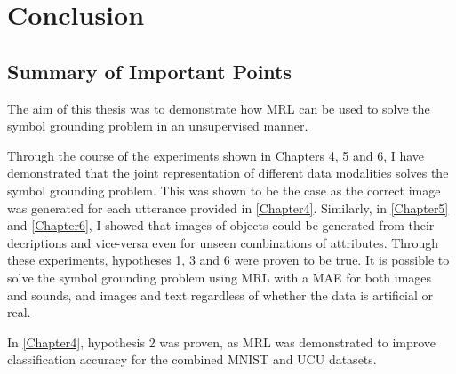 
\chapter{Conclusion} %

\label{Chapter7} %



\section{Summary of Important Points}
The aim of this thesis was to demonstrate how \ac{MRL} can be used to solve the symbol grounding problem in an unsupervised manner.

Through the course of the experiments shown in Chapters 4, 5 and 6, I have demonstrated that the joint representation of different data modalities solves the symbol grounding problem. This was shown to be the case as the correct image was generated for each utterance provided in \autoref{Chapter4}. Similarly, in \autoref{Chapter5} and \autoref{Chapter6}, I showed that images of objects could be generated from their decriptions and vice-versa even for unseen combinations of attributes. Through these experiments, hypotheses 1, 3 and 6 were proven to be true. It is possible to solve the symbol grounding problem using \ac{MRL} with a \ac{MAE} for both images and sounds, and images and text regardless of whether the data is artificial or real.

In \autoref{Chapter4}, hypothesis 2 was proven, as \ac{MRL} was demonstrated to improve classification accuracy for the combined MNIST and UCU datasets.

